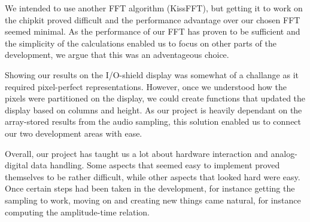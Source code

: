 \documentclass[a4paper,11pt]{article}
\begin{document}
We intended to use another FFT algorithm (KissFFT), but getting it to work on the chipkit proved difficult and the performance advantage over our chosen FFT seemed minimal. As the performance of our FFT has proven to be sufficient and the simplicity of the calculations enabled us to focus on other parts of the development, we argue that this was an adventageous choice.

Showing our results on the I/O-shield display was somewhat of a challange as it required pixel-perfect representations. However, once we understood how the pixels were partitioned on the display, we could create functions that updated the display based on columns and height. As our project is heavily dependant on the array-stored results from the audio sampling, this solution enabled us to connect our two development areas with ease.

Overall, our project has taught us a lot about hardware interaction and analog-digital data handling. Some aspects that seemed easy to implement proved themselves to be rather difficult, while other aspects that looked hard were easy. Once certain steps had been taken in the development, for instance getting the sampling to work, moving on and creating new things came natural, for instance computing the amplitude-time relation.
\end{document}
